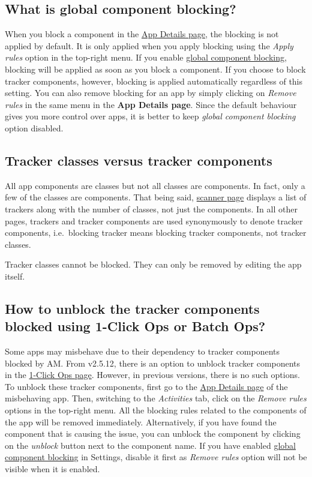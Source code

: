 \subsection{What is global component blocking?}\label{subsec:faq:what-is-global-component-blocking}
When you block a component in the \hyperref[sec:app-details-page]{App Details page}, the blocking is not applied by
default. It is only applied when you apply blocking using the \textit{Apply rules} option in the top-right menu. If you
enable \hyperref[subsubsec:instant-component-blocking]{global component blocking}, blocking will be applied as soon as you block a component. If you choose to
block tracker components, however, blocking is applied automatically regardless of this setting. You can also remove
blocking for an app by simply clicking on \textit{Remove rules} in the same menu in the \textbf{App Details page}. Since
the default behaviour gives you more control over apps, it is better to keep \textit{global component blocking} option
disabled.

\subsection{Tracker classes versus tracker components}\label{subsec:tracker-classes-versus-tracker-components}
All app components are classes but not all classes are components. In fact, only a few of the classes are components.
That being said, \hyperref[sec:scanner-page]{scanner page} displays a list of trackers along with the number of classes,
not just the components. In all other pages, trackers and tracker components are used synonymously to denote tracker
components, i.e.\ blocking tracker means blocking tracker components, not tracker classes.

\begin{tip}[Info]
    Tracker classes cannot be blocked. They can only be removed by editing the app itself.
\end{tip}

\subsection{How to unblock the tracker components blocked using 1-Click Ops or Batch Ops?}\label{subsec:faq:how-to-unblock-tracker-components}
Some apps may misbehave due to their dependency to tracker components blocked by AM. From v2.5.12, there is an option
to unblock tracker components in the \hyperref[sec:1-click-ops-page]{1-Click Ops page}. However, in previous versions,
there is no such options. To unblock these tracker components, first go to the \hyperref[sec:app-details-page]{App
Details page} of the misbehaving app. Then, switching to the \textit{Activities} tab, click on the \textit{Remove rules}
options in the top-right menu. All the blocking rules related to the components of the app will be removed immediately.
Alternatively, if you have found the component that is causing the issue, you can unblock the component by clicking on
the \textit{unblock} button next to the component name. If you have enabled
\hyperref[subsubsec:instant-component-blocking]{global component blocking} in Settings, disable it first as
\textit{Remove rules} option will not be visible when it is enabled.

